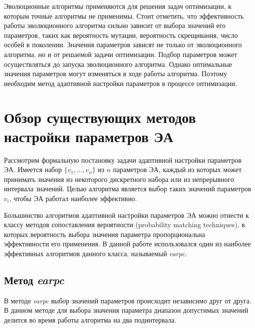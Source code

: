 Эволюционные алгоритмы применяются для решения задач оптимизации, к которым точные алгоритмы не применимы. Стоит отметить, что эффективность работы эволюционного алгоритма сильно зависит от выбора значений его параметров, таких как вероятность мутации, вероятность скрещивания, число особей в поколении. Значения параметров зависят не только от эволюционного алгоритма, но и от решаемой задачи оптимизации. Подбор параметров может осуществляться до запуска эволюционного алгоритма. Однако оптимальные значения параметров могут изменяться в ходе работы алгоритма. Поэтому необходим метод адаптивной настройки параметров в процессе оптимизации.

\section{Обзор существующих методов настройки параметров ЭА}

Рассмотрим формальную постановку задачи адаптивной настройки параметров ЭА. Имеется набор $\{v_1, ..., v_n\}$ из $n$ параметров ЭА, каждый из которых может принимать значения из некоторого дискретного набора или из непрерывного интервала значений. Целью алгоритма является выбор таких значений параметров $v_i$, чтобы ЭА работал наиболее эффективно.

Большинство алгоритмов адаптивной настройки параметров ЭА можно отнести к классу методов сопоставления  вероятности (probability matching techniques), в которых вероятность выбора значения параметра пропорциональна эффективности его применения. В данной работе использовался один из наиболее эффективных алгоритмов данного класса, называемый \textit{earpc}.

\subsection{Метод \textit{earpc}}
\label{earpc}
В методе \textit{earpc} выбор значений параметров происходит независимо друг от друга. В данном методе для выбора значения параметра диапазон допустимых значений делится во время работы алгоритма на два подинтервала.


